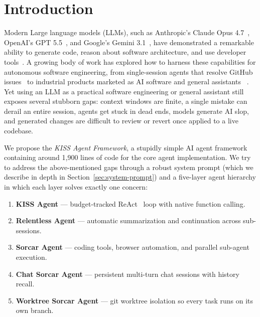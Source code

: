 \documentclass{article}
\begin{document}
\section{Introduction}
\label{sec:intro}

Modern Large language models (LLMs), such as Anthropic's Claude Opus 4.7~\citep{anthropic2026opus47}, OpenAI's GPT 5.5~\citep{openai2026gpt55}, and Google's Gemini 3.1~\citep{google2026gemini31}, have demonstrated a remarkable ability to generate code, reason about software architecture, and use developer tools~\citep{chen2021evaluating,roziere2023code}.  A growing body of work has explored how to harness these capabilities for autonomous software engineering, from single-session agents that resolve GitHub issues~\citep{yang2024sweagent,wang2024openhands} to industrial products marketed as AI software and general assistants ~\citep{copilot2021,cursor2024,devin2024,claudecode2025,codex2025,openclaw2025}. Yet using an LLM as a practical software engineering or general assistant still exposes several stubborn gaps: context windows are finite, a single mistake can derail an entire session, agents get stuck in dead ends, models generate AI slop, and generated changes are difficult to review or revert once applied to a live codebase.

We propose the \emph{KISS Agent Framework}, a stupidly simple AI agent framework containing around 1,900 lines of code for the core agent implementation.  We try to address the above-mentioned gaps through a robust system prompt (which we describe in depth in Section~\ref{sec:system-prompt}) and a five-layer agent hierarchy in which each layer solves exactly one concern:

\begin{enumerate}[nosep]
  \item \textbf{KISS Agent} --- budget-tracked
ReAct~\citep{yao2023react} loop with native function calling.
  \item \textbf{Relentless Agent} --- automatic summarization and continuation 
across sub-sessions.
  \item \textbf{Sorcar Agent} --- coding tools, browser automation,
and parallel sub-agent execution.
  \item \textbf{Chat Sorcar Agent} --- persistent multi-turn chat
sessions with history recall.
  \item \textbf{Worktree Sorcar Agent} --- git worktree isolation so
every task runs on its own branch.
\end{enumerate}
\end{document}
